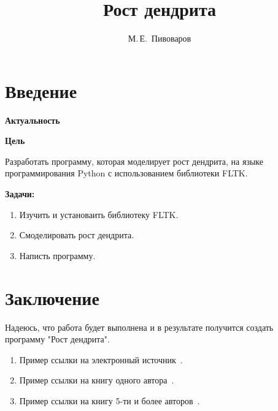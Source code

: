 \documentclass[14pt, oneside]{altsu-report}
\title{Рост дендрита}
\author{М.\,Е.~Пивоваров}
\institute{Институт цифровых технологий, электроники и физики}
\date{\the\year}
\begin{document}
\maketitle

\setcounter{page}{2}
\makeabstract
\tableofcontents

\chapter*{Введение}

\textbf{Актуальность}

\textbf{Цель}

Разработать программу, которая моделирует рост дендрита, на языке программирования Python с использованием библиотеки FLTK. 

\textbf{Задачи:}
\begin{enumerate}
\item Изучить и установаить библиотеку FLTK.
\item Смоделировать рост дендрита.
\item Написть программу.
\end{enumerate}





\chapter*{Заключение}
Надеюсь, что работа будет выполнена и в результате получится создать программу "Рост дендрита".

\begin{enumerate}
\item Пример ссылки на электронный источник~\cite{wikiRUDendrite, sfPyFLTK}.
\item Пример ссылки на книгу одного автора~\cite{book1author}.
\item Пример ссылки на книгу 5-ти и более авторов~\cite{book5author}.
\end{enumerate}

\newpage
{}
\printbibliography[title={Список использованной литературы}]
\end{document}
